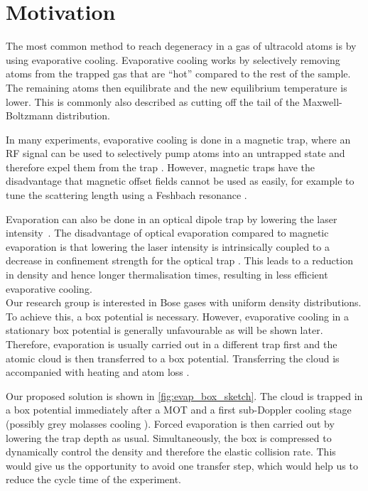 
\chapter{Motivation}
The most common method to reach degeneracy in a gas of ultracold atoms is by using evaporative cooling. Evaporative cooling works by selectively removing atoms from the trapped gas that are \enquote{hot} compared to the rest of the sample. The remaining atoms then equilibrate and the new equilibrium temperature is lower. This is commonly also described as cutting off the tail of the Maxwell-Boltzmann distribution. 

In many experiments, evaporative cooling is done in a magnetic trap, where an RF signal can be used to selectively pump atoms into an untrapped state and therefore expel them from the trap \cite{PhysRevLett.74.3352}. However, magnetic traps have the disadvantage that magnetic offset fields cannot be used as easily, for example to tune the scattering length using a Feshbach resonance \cite{PhysRevA.71.011602}.

Evaporation can also be done in an optical dipole trap by lowering the laser intensity~\cite{Chaudhuri_2007}. The disadvantage of optical evaporation compared to magnetic evaporation is that lowering the laser intensity is intrinsically coupled to a decrease in confinement strength for the optical trap \cite{PhysRevA.79.061406}. This leads to a reduction in density and hence longer thermalisation times, resulting in less efficient evaporative cooling.\\[\baselineskip]
\noindent
Our research group is interested in Bose gases with uniform density distributions. To achieve this, a box potential is necessary. However, evaporative cooling in a stationary box potential is generally unfavourable as will be shown later. Therefore, evaporation is usually carried out in a different trap first and the atomic cloud is then transferred to a box potential. Transferring the cloud is accompanied with heating and atom loss \cite{PhysRevLett.110.200406}. 

Our proposed solution is shown in \cref{fig:evap_box_sketch}. The cloud is trapped in a box potential immediately after a MOT and a first sub-Doppler cooling stage (possibly grey molasses cooling \cite{Rosi2018enhancedGM}). Forced evaporation is then carried out by lowering the trap depth as usual. Simultaneously, the box is compressed to dynamically control the density and therefore the elastic collision rate. This would give us the opportunity to avoid one transfer step, which would help us to reduce the cycle time of the experiment. 

